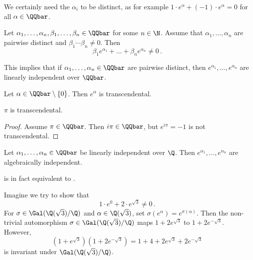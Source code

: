 We certainly need the \( \alpha_i \) to be distinct, as for example \( 1 \cdot e^\alpha + (-1) \cdot e^\alpha = 0 \) for all \( \alpha \in \QQbar \).

\begin{thmn}\label{thm:4.15} 
	Let \( \alpha_1, \dotsc, \alpha_n, \beta_1, \dotsc, \beta_n \in \QQbar \) for some \( n \in \N \).
	Assume that \( \alpha_1, \dotsc, \alpha_n \) are pairwise distinct and \( \beta_1 \dotsm \beta_n \neq 0 \).
	Then
	\[ \beta_1 e^{\alpha_1} + \dots + \beta_n e^{\alpha_n} \neq 0 \,. \]
\end{thmn}

\begin{rem*}
	This implies that if \( \alpha_1, \dotsc, \alpha_n \in \QQbar \) are pairwise distinct, then \( e^{\alpha_1}, \dotsc, e^{\alpha_n} \) are linearly independent over \( \QQbar \).
\end{rem*}

\begin{cor}
	Let \( \alpha \in \QQbar \setminus \{0\} \).
	Then \( e^\alpha \) is transcendental.
\end{cor}

\begin{cor}
	\( \pi \) is transcendental.
\end{cor}

\begin{proof}
	Assume \( \pi \in \QQbar \).
	Then \( i \pi \in \QQbar \), but \( e^{i\pi} = -1 \) is not transcendental.
\end{proof}

\begin{cor}\label{thm:4.18}
	Let \( \alpha_1, \dotsc, \alpha_n \in \QQbar \) be linearly independent over \( \Q \).
	Then \( e^{\alpha_1}, \dotsc, e^{\alpha_n} \) are algebraically independent.
\end{cor}

\begin{rem*}
	 is in fact equivalent to .
\end{rem*}

\begin{exmp*}
	Imagine we try to show that
	\[ 1 \cdot e^0 + 2 \cdot e^{\sqrt{3}} \neq 0 \,. \]
	For \( \sigma \in \Gal(\Q(\sqrt{3})/\Q) \) and \( \alpha \in \Q(\sqrt{3}) \), set \( \sigma(e^\alpha) = e^{\sigma(\alpha)} \).
	Then the non-trivial automorphism \( \sigma \in \Gal(\Q(\sqrt{3})/\Q) \) maps \( 1+2e^{\sqrt{3}} \) to \( 1+2e^{-\sqrt{3}} \).
	However,
	\[ \left( 1 + e^{\sqrt{3}} \right) \left( 1 + 2e^{-\sqrt{3}} \right) = 1+4 + 2e^{\sqrt{3}} + 2e^{-\sqrt{3}} \]
	is invariant under \( \Gal(\Q(\sqrt{3})/\Q) \).
\end{exmp*}

